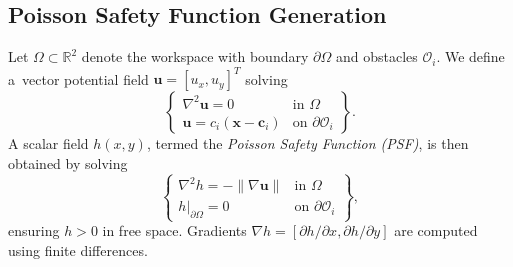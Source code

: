 \documentclass{svproc}
\begin{document}
\subsection{Poisson Safety Function Generation}
Let $\Omega \subset \mathbb{R}^2$ denote the workspace with boundary
$\partial\Omega$ and obstacles $\mathcal{O}_i$. We define a~vector
potential field $\mathbf{u} = [u_x,u_y]^T$ solving
\begin{equation}
    \left\lbrace
    \begin{array}{ll}
        \nabla^2 \mathbf{u} = 0 & \text{in } \Omega \\
        \mathbf{u} = c_i (\mathbf{x}-\mathbf{c}_i) & \text{on } \partial \mathcal{O}_i
    \end{array}
    \right\rbrace
    .
\end{equation}
A scalar field $h(x,y)$, termed the \emph{Poisson Safety Function (PSF)},
is then obtained by solving
\begin{equation}
    \left\lbrace
    \begin{array}{ll}
        \nabla^2 h = -\|\nabla \mathbf{u}\| & \text{in } \Omega \\
        h|_{\partial\Omega}=0 & \text{on } \partial \mathcal{O}_i
    \end{array}
    \right\rbrace
    ,
\end{equation}
ensuring $h>0$ in free space. Gradients $\nabla h = [\partial h/\partial
x,\partial h/\partial y]$ are computed using finite differences.

\end{document}
